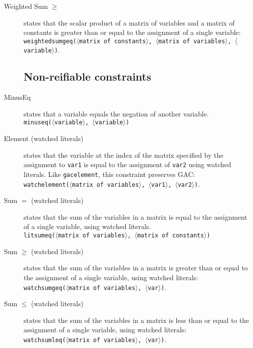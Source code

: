 \documentclass{article}
\begin{document}
\begin{small}
\begin{description}
\item[Weighted Sum $\mathbf{\geq}$] states that the scalar product of
a matrix of variables and a matrix of constants is greater than or
equal to the assignment of a single variable:\\
\texttt{weightedsumgeq($\langle$matrix of constants$\rangle$,
$\langle$matrix of variables$\rangle$, $\langle$variable$\rangle$)}.


\subsection{Non-reifiable constraints}

\item[MinusEq] states that a variable equals the negation of another variable.
\\
\texttt{minuseq($\langle$variable$\rangle$, $\langle$variable$\rangle$)}

\item[Element (watched literals)] states that the variable at the index of the matrix
specified by the assignment to \texttt{var1} is equal to the
assignment of \texttt{var2} using watched literals.  Like \texttt{gacelement}, this constraint preserves GAC:\\ 
\texttt{watchelement($\langle$matrix of
variables$\rangle$, $\langle$var1$\rangle$, $\langle$var2$\rangle$)}.

\item[Sum $\mathbf{=}$ (watched literals)] states that the sum of the variables in a
matrix is equal to the assignment of a single variable, using watched literals. \\
\texttt{litsumeq($\langle$matrix of variables$\rangle$, $\langle$matrix of constants$\rangle$)}


\item[Sum $\mathbf{\geq}$ (watched literals)] states that the sum of the variables in a
matrix is greater than or equal to the assignment of a single
variable, using watched literals:\\ \texttt{watchsumgeq($\langle$matrix of variables$\rangle$,
$\langle$var$\rangle$)}.

\item[Sum $\mathbf{\leq}$ (watched literals)] states that the sum of the variables in a
matrix is less than or equal to the assignment of a single variable, using watched literals:\\
\texttt{watchsumleq($\langle$matrix of variables$\rangle$,
$\langle$var$\rangle$)}.


\end{description}
\end{small}
\end{document}

